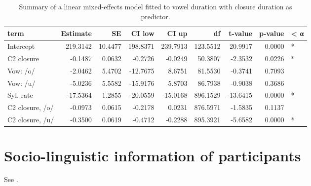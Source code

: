 \documentclass[preprint]{JASAnew}
\begin{document}
\begin{table}

\caption{\label{tab:vow-clo-table}Summary of a linear mixed-effects model fitted to vowel duration with closure duration as predictor.}
\centering
\begin{tabular}[t]{lrrrrrrrl}
\toprule
term & Estimate & SE & CI low & CI up & df & t-value & p-value & < α\\
\midrule
Intercept & 219.3142 & 10.4477 & 198.8371 & 239.7913 & 123.5512 & 20.9917 & 0.0000 & *\\
C2 closure & -0.1487 & 0.0632 & -0.2726 & -0.0249 & 50.3807 & -2.3532 & 0.0226 & *\\
Vow: /o/ & -2.0462 & 5.4702 & -12.7675 & 8.6751 & 81.5530 & -0.3741 & 0.7093 & \\
Vow: /u/ & -5.0236 & 5.5582 & -15.9176 & 5.8703 & 86.7938 & -0.9038 & 0.3686 & \\
Syl. rate & -17.5364 & 1.2855 & -20.0559 & -15.0168 & 896.1529 & -13.6415 & 0.0000 & *\\
\addlinespace
C2 closure, /o/ & -0.0973 & 0.0615 & -0.2178 & 0.0231 & 876.5971 & -1.5835 & 0.1137 & \\
C2 closure, /u/ & -0.3500 & 0.0619 & -0.4712 & -0.2288 & 895.3921 & -5.6582 & 0.0000 & *\\
\bottomrule
\end{tabular}
\end{table}

\hypertarget{socio-linguistic-information-of-participants}{%
\section{Socio-linguistic information of
participants}\label{socio-linguistic-information-of-participants}}

\label{a:socioling}

See .
\end{document}
